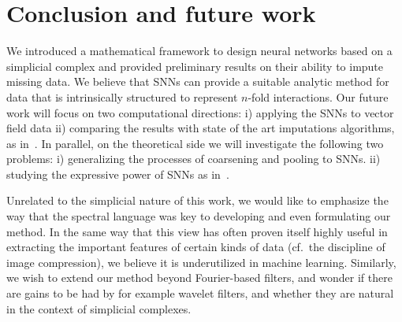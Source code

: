 \section{Conclusion and future work}

We introduced a mathematical framework to design neural networks based on a simplicial complex and provided preliminary results on their ability to impute missing data.
We believe that SNNs can provide a suitable analytic method for data that is intrinsically structured to represent $n$-fold interactions.
Our future work will focus on two computational directions:  i) applying the SNNs to vector field data ii) comparing the results with state of the art imputations algorithms, as in~\cite{spinelli2020neural}.
In parallel, on the theoretical side we will investigate the following two problems: i) generalizing the processes of coarsening and pooling to SNNs. ii) studying the expressive power of SNNs as in~\cite{morris2019weisfeiler}. 

Unrelated to the simplicial nature of this work, we would like to emphasize the way that the spectral language was key to developing and even formulating our method. In the same way that this view has often proven itself highly useful in extracting the important features of certain kinds of data (cf.\ the discipline of image compression), we believe it is underutilized in machine learning.
Similarly, we wish to extend our method beyond Fourier-based filters, and wonder if there are gains to be had by for example wavelet filters, and whether they are natural in the context of simplicial complexes.
